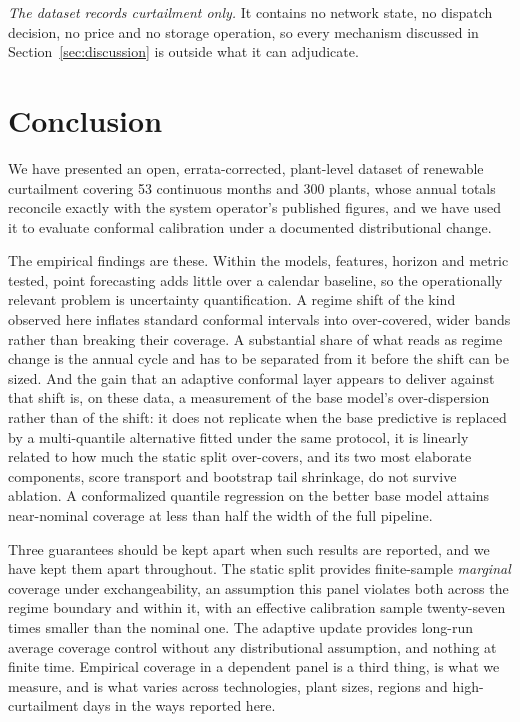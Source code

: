 \documentclass[preprint,3p,times]{elsarticle}
\begin{document}
\emph{The dataset records curtailment only.} It contains no network state, no dispatch decision, no price and no storage operation, so every mechanism discussed in Section~\ref{sec:discussion} is outside what it can adjudicate.

\section{Conclusion}
\label{sec:conclusion}

We have presented an open, errata-corrected, plant-level dataset of renewable curtailment covering 53 continuous months and 300 plants, whose annual totals reconcile exactly with the system operator's published figures, and we have used it to evaluate conformal calibration under a documented distributional change.

The empirical findings are these. Within the models, features, horizon and metric tested, point forecasting adds little over a calendar baseline, so the operationally relevant problem is uncertainty quantification. A regime shift of the kind observed here inflates standard conformal intervals into over-covered, wider bands rather than breaking their coverage. A substantial share of what reads as regime change is the annual cycle and has to be separated from it before the shift can be sized. And the gain that an adaptive conformal layer appears to deliver against that shift is, on these data, a measurement of the base model's over-dispersion rather than of the shift: it does not replicate when the base predictive is replaced by a multi-quantile alternative fitted under the same protocol, it is linearly related to how much the static split over-covers, and its two most elaborate components, score transport and bootstrap tail shrinkage, do not survive ablation. A conformalized quantile regression on the better base model attains near-nominal coverage at less than half the width of the full pipeline.

Three guarantees should be kept apart when such results are reported, and we have kept them apart throughout. The static split provides finite-sample \emph{marginal} coverage under exchangeability, an assumption this panel violates both across the regime boundary and within it, with an effective calibration sample twenty-seven times smaller than the nominal one. The adaptive update provides long-run average coverage control without any distributional assumption, and nothing at finite time. Empirical coverage in a dependent panel is a third thing, is what we measure, and is what varies across technologies, plant sizes, regions and high-curtailment days in the ways reported here.
\end{document}
